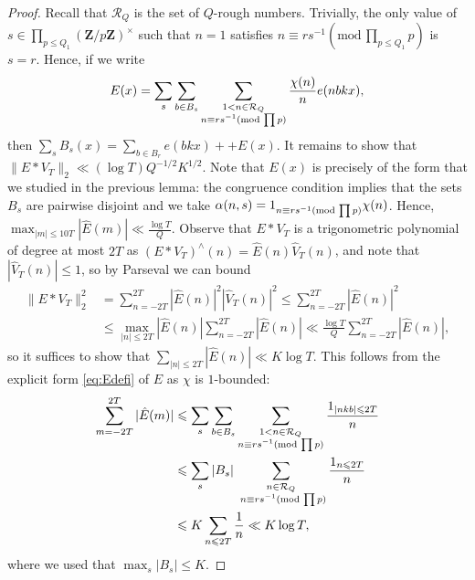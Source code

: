 \documentclass[11pt, reqno]{amsart}
\newcommand{\md}[1]{\ensuremath{(\mbox{mod}\, #1)}}
\newcommand{\mdsub}[1]{\ensuremath{(\mbox{\scriptsize mod}\, #1)}}
\begin{document}
\begin{proof}
Recall that $\mathcal{R}_Q$ is the set of $Q$-rough numbers. Trivially, the only value of $s\in\prod_{p\leqslant Q_1}(\mathbf{Z}/p\mathbf{Z})^\times$ such that $n=1$ satisfies $n\equiv rs^{-1}\md{\prod_{p\leqslant Q_1}p}$ is $s=r$. Hence, if we write
\begin{equation}\label{eq:Edefi}
    E(x)=\sum_s\sum_{b\in B_s}\sum_{\substack{1<n\in\mathcal{R}_Q \\ n\equiv rs^{-1}\mdsub{\prod p}}} \frac{\chi(n)}{n}e(nbkx),
\end{equation}
then
$\sum_s B_s(x)=\sum_{b\in B_r}e(bkx)++ E(x)$.
It remains to show that $\lVert E*V_{T}\rVert_2\ll (\log T)Q^{-1/2}K^{1/2}$. Note that $E(x)$ is precisely of the form that we studied in the previous lemma: the congruence condition implies that the sets $B_s$ are pairwise disjoint and we take $\alpha(n,s)=1_{n\equiv rs^{-1}\mdsub{\prod p}}\chi(n)$. Hence, $\max_{|m|\leqslant 10T}|\hat{E}(m)|\ll \frac{\log T}{Q}$. Observe that $E*V_{T}$ is a trigonometric polynomial of degree at most $2T$ as $(E*V_T)^\wedge(n)=\hat{E}(n)\hat{V}_{T}(n)$, and note that $|\hat{V}_{T}(n)|\leqslant 1$, so by Parseval we can bound
\begin{align*}
    \lVert E*V_{T}\rVert_2^2&=\sum_{n=-2T}^{2T}|\hat{E}(n)|^2|\hat{V}_{T}(n)|^2\leqslant \sum_{n=-2T}^{2T}|\hat{E}(n)|^2\\
    &\leqslant \max_{|n|\leqslant 2T}|\hat{E}(n)|\sum_{n=-2T}^{2T}|\hat{E}(n)|\ll \frac{\log T}{Q}\sum_{n=-2T}^{2T}|\hat{E}(n)|,
\end{align*}
so it suffices to show that $\sum_{|n|\leqslant 2T}|\hat{E}(n)|\ll K\log T$. This follows from the explicit form \eqref{eq:Edefi} of $E$ as $\chi$ is $1$-bounded: 
\begin{align*}
    \sum_{m=-2T}^{2T}|\hat{E}(m)|&\leqslant \sum_{s}\sum_{b\in B_s}\sum_{\substack{1<n\in\mathcal{R}_Q\\ n\equiv rs^{-1}\mdsub{\prod p}}}\frac{1_{|nkb|\leqslant 2T}}{n}\\
    &\leqslant \sum_s |B_s|\sum_{\substack{
    n\in\mathcal{R}_Q\\\ n\equiv rs^{-1}\mdsub{\prod p}}}\frac{1_{n\leqslant 2T}}{n}\\
    &\leqslant K\sum_{n\leqslant 2T}\frac{1}{n}\ll K\log T,
\end{align*}
where we used that $\max_s|B_s|\leqslant K$.
\end{proof}
\end{document}
